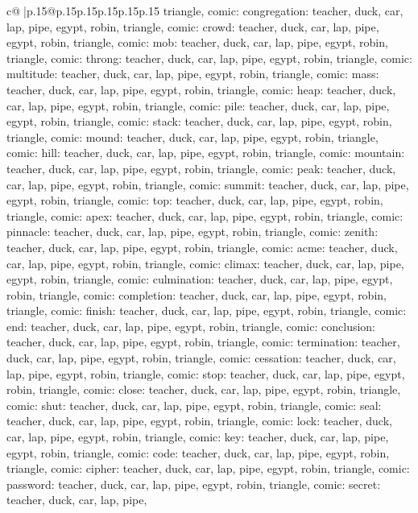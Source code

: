 \documentclass{article}
\begin{document}
{\begin{supertabular}{c@{$\;$}|p{.15\linewidth}@{}p{.15\linewidth}p{.15\linewidth}p{.15\linewidth}p{.15\linewidth}p{.15\linewidth}}
{{{triangle, comic\n\nCLUE: congregation\nTARGETS: teacher, duck, car, lap, pipe, egypt, robin, triangle, comic\n\nCLUE: crowd\nTARGETS: teacher, duck, car, lap, pipe, egypt, robin, triangle, comic\n\nCLUE: mob\nTARGETS: teacher, duck, car, lap, pipe, egypt, robin, triangle, comic\n\nCLUE: throng\nTARGETS: teacher, duck, car, lap, pipe, egypt, robin, triangle, comic\n\nCLUE: multitude\nTARGETS: teacher, duck, car, lap, pipe, egypt, robin, triangle, comic\n\nCLUE: mass\nTARGETS: teacher, duck, car, lap, pipe, egypt, robin, triangle, comic\n\nCLUE: heap\nTARGETS: teacher, duck, car, lap, pipe, egypt, robin, triangle, comic\n\nCLUE: pile\nTARGETS: teacher, duck, car, lap, pipe, egypt, robin, triangle, comic\n\nCLUE: stack\nTARGETS: teacher, duck, car, lap, pipe, egypt, robin, triangle, comic\n\nCLUE: mound\nTARGETS: teacher, duck, car, lap, pipe, egypt, robin, triangle, comic\n\nCLUE: hill\nTARGETS: teacher, duck, car, lap, pipe, egypt, robin, triangle, comic\n\nCLUE: mountain\nTARGETS: teacher, duck, car, lap, pipe, egypt, robin, triangle, comic\n\nCLUE: peak\nTARGETS: teacher, duck, car, lap, pipe, egypt, robin, triangle, comic\n\nCLUE: summit\nTARGETS: teacher, duck, car, lap, pipe, egypt, robin, triangle, comic\n\nCLUE: top\nTARGETS: teacher, duck, car, lap, pipe, egypt, robin, triangle, comic\n\nCLUE: apex\nTARGETS: teacher, duck, car, lap, pipe, egypt, robin, triangle, comic\n\nCLUE: pinnacle\nTARGETS: teacher, duck, car, lap, pipe, egypt, robin, triangle, comic\n\nCLUE: zenith\nTARGETS: teacher, duck, car, lap, pipe, egypt, robin, triangle, comic\n\nCLUE: acme\nTARGETS: teacher, duck, car, lap, pipe, egypt, robin, triangle, comic\n\nCLUE: climax\nTARGETS: teacher, duck, car, lap, pipe, egypt, robin, triangle, comic\n\nCLUE: culmination\nTARGETS: teacher, duck, car, lap, pipe, egypt, robin, triangle, comic\n\nCLUE: completion\nTARGETS: teacher, duck, car, lap, pipe, egypt, robin, triangle, comic\n\nCLUE: finish\nTARGETS: teacher, duck, car, lap, pipe, egypt, robin, triangle, comic\n\nCLUE: end\nTARGETS: teacher, duck, car, lap, pipe, egypt, robin, triangle, comic\n\nCLUE: conclusion\nTARGETS: teacher, duck, car, lap, pipe, egypt, robin, triangle, comic\n\nCLUE: termination\nTARGETS: teacher, duck, car, lap, pipe, egypt, robin, triangle, comic\n\nCLUE: cessation\nTARGETS: teacher, duck, car, lap, pipe, egypt, robin, triangle, comic\n\nCLUE: stop\nTARGETS: teacher, duck, car, lap, pipe, egypt, robin, triangle, comic\n\nCLUE: close\nTARGETS: teacher, duck, car, lap, pipe, egypt, robin, triangle, comic\n\nCLUE: shut\nTARGETS: teacher, duck, car, lap, pipe, egypt, robin, triangle, comic\n\nCLUE: seal\nTARGETS: teacher, duck, car, lap, pipe, egypt, robin, triangle, comic\n\nCLUE: lock\nTARGETS: teacher, duck, car, lap, pipe, egypt, robin, triangle, comic\n\nCLUE: key\nTARGETS: teacher, duck, car, lap, pipe, egypt, robin, triangle, comic\n\nCLUE: code\nTARGETS: teacher, duck, car, lap, pipe, egypt, robin, triangle, comic\n\nCLUE: cipher\nTARGETS: teacher, duck, car, lap, pipe, egypt, robin, triangle, comic\n\nCLUE: password\nTARGETS: teacher, duck, car, lap, pipe, egypt, robin, triangle, comic\n\nCLUE: secret\nTARGETS: teacher, duck, car, lap, pipe, }}}
\end{supertabular}}
\end{document}
